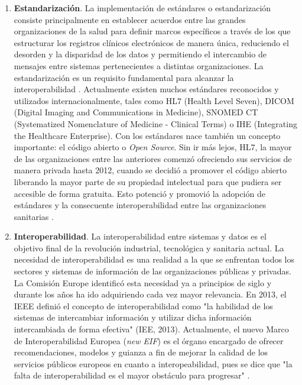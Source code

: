 \begin{enumerate}[label=\alph*.]

    \item \textbf{Estandarización}. La implementación de estándares o estandarización consiste principalmente en establecer acuerdos entre las grandes organizaciones de la salud para definir marcos específicos a través de los que estructurar los registros clínicos electrónicos de manera única, reduciendo el desorden y la disparidad de los datos y permitiendo el intercambio de mensajes entre sistemas pertenecientes a distintas organizaciones. La estandarización es un requisito fundamental para alcanzar la interoperabilidad \cite{katehakis2019framework}. Actualmente existen muchos estándares reconocidos y utilizados internacionalmente, tales como HL7 (Health Level Seven), DICOM (Digital Imaging and Communications in Medicine), SNOMED CT (Systematized Nomenclature of Medicine - Clinical Terms) o IHE (Integrating the Healthcare Enterprise). Con los estándares nace también un concepto importante: el código abierto o \textit{Open Source}. Sin ir más lejos, HL7, la mayor de las organizaciones entre las anteriores comenzó ofreciendo sus servicios de manera privada hasta 2012, cuando se decidió a promover el código abierto liberando la mayor parte de su propiedad intelectual para que pudiera ser accesible de forma gratuita. Esto potenció y promovió la adopción de estándares y la consecuente interoperabilidad entre las organizaciones sanitarias \cite{berryman2013data}.

    \item  \textbf{Interoperabilidad}. La interoperabilidad entre sistemas y datos es el objetivo final de la revolución industrial, tecnológica y sanitaria actual. La necesidad de interoperabilidad es una realidad a la que se enfrentan todos los sectores y sistemas de información de las organizaciones públicas y privadas. La Comisión Europe identificó esta necesidad ya a principios de siglo \cite{CEU1999ida} y durante los años ha ido adquiriendo cada vez mayor relevancia. En 2013, el IEEE definió el concepto de interoperabilidad como 
    "la habilidad de los sistemas de intercambiar información y utilizar dicha información intercambiada de forma efectiva" (IEE, 2013). Actualmente, el nuevo Marco de Interoperabilidad Europea (\textit{new EIF}) es el órgano encargado de ofrecer recomendaciones, modelos y guianza a fin de mejorar la calidad de los servicios públicos europeos en cuanto a interopeabilidad, pues se dice que "la falta de interoperabilidad es el mayor obstáculo para progresar" \cite{kouroubali2019new}.
    

\end{enumerate}
